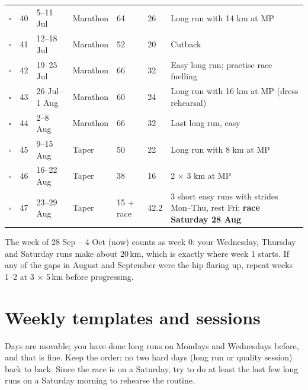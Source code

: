 \documentclass[11pt,a4paper]{article}
\begin{document}
{\begin{longtable}{@{}c r L{2.3cm} L{1.6cm} L{1.2cm} L{1.1cm} L{6.3cm}@{}}
$\square$ & 40 & 5--11 Jul & Marathon & 64 & 26 & Long run with 14 km at MP \\
$\square$ & 41 & 12--18 Jul & Marathon & 52 & 20 & Cutback \\
$\square$ & 42 & 19--25 Jul & Marathon & 66 & 32 & Easy long run; practise race fuelling \\
$\square$ & 43 & 26 Jul--1 Aug & Marathon & 60 & 24 & Long run with 16 km at MP (dress rehearsal) \\
$\square$ & 44 & 2--8 Aug & Marathon & 66 & 32 & Last long run, easy \\
\midrule
$\square$ & 45 & 9--15 Aug & Taper & 50 & 22 & Long run with 8 km at MP \\
$\square$ & 46 & 16--22 Aug & Taper & 38 & 16 & 2 $\times$ 3 km at MP \\
$\square$ & 47 & 23--29 Aug & Taper & 15 + race & 42.2 & 3 short easy runs with strides Mon--Thu, rest Fri; \textbf{race Saturday 28 Aug} \\
\end{longtable}
}

The week of 28 Sep -- 4 Oct (now) counts as week 0: your Wednesday, Thursday and Saturday runs make about 20\,km, which is exactly where week 1 starts. If any of the gaps in August and September were the hip flaring up, repeat weeks 1--2 at 3 $\times$ 5\,km before progressing.

\section*{Weekly templates and sessions}

Days are movable; you have done long runs on Mondays and Wednesdays before, and that is fine. Keep the order: no two hard days (long run or quality session) back to back. Since the race is on a Saturday, try to do at least the last few long runs on a Saturday morning to rehearse the routine.
\end{document}
